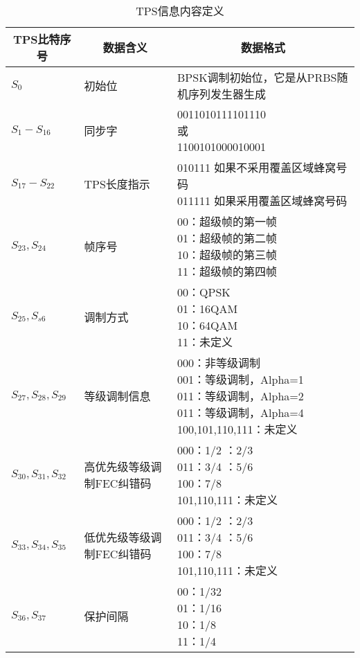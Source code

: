 \begin{table}[!htbp]
	\centering
	\caption{TPS信息内容定义}
	\begin{tabular}{|m{2cm}<{\centering}|m{3cm}<{\centering}|m{8cm}<{\centering}|}
	\hline\hline
	\multicolumn{1}{|c|}{TPS比特序号} & \multicolumn{1}{c|}{数据含义} & \multicolumn{1}{c|}{数据格式} \\
	\hline
	$S_0$ & 初始位 & BPSK调制初始位，它是从PRBS随机序列发生器生成 \\
	\hline
	$S_1-S_{16}$ & 同步字 & \tabincell{c}{0011010111101110 \\ 或 \\ 1100101000010001} \\
	\hline
	$S_{17}-S_{22}$ & TPS长度指示 & \tabincell{l}{010111 如果不采用覆盖区域蜂窝号码 \\ 011111 如果采用覆盖区域蜂窝号码}\\
	\hline
	$S_{23},S_{24}$ & 帧序号 & \tabincell{l}{00：超级帧的第一帧 \\ 01：超级帧的第二帧 \\ 10：超级帧的第三帧 \\ 11：超级帧的第四帧} \\
	\hline
	$S_{25},S_{s6}$ & 调制方式 & \tabincell{l}{00：QPSK \\ 01：16QAM \\ 10：64QAM \\ 11：未定义} \\
	\hline
	$S_{27},S_{28},S_{29}$ & 等级调制信息 & \tabincell{l}{000：非等级调制 \\ 001：等级调制，Alpha=1 \\ 011：等级调制，Alpha=2 \\ 011：等级调制，Alpha=4 \\ 100,101,110,111：未定义} \\
	\hline
	$S_{30},S_{31},S_{32}$ & 高优先级等级调制FEC纠错码 & \tabincell{c}{000：1/2 \qquad 001：2/3 \\ 011：3/4 \qquad 011：5/6 \\ 100：7/8 \\ 101,110,111：未定义} \\
	\hline
	$S_{33},S_{34},S_{35}$ & 低优先级等级调制FEC纠错码 & \tabincell{c}{000：1/2 \qquad 001：2/3 \\ 011：3/4 \qquad 011：5/6 \\ 100：7/8 \\ 101,110,111：未定义} \\
	\hline
	$S_{36},S_{37}$ & 保护间隔 & \tabincell{l}{00：1/32 \\ 01：1/16 \\ 10：1/8 \\ 11：1/4} \\

\end{tabular}
\end{table}
